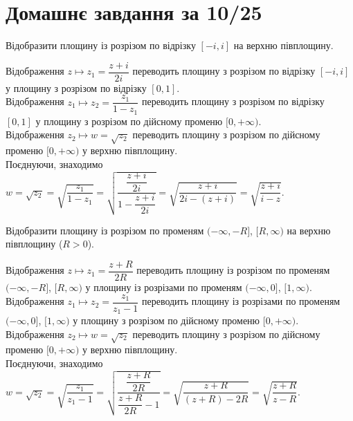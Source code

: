 \setcounter{section}{9}

\section{Домашнє завдання за 10/25}

\begin{problem}[Волковиський, 2.94]
    Відобразити площину із розрізом по відрізку $[-i, i]$ на верхню півплощину.
\end{problem}

\begin{solution}
    Відображення $z \mapsto z_1 = \dfrac{z + i}{2i}$ переводить площину з розрізом по відрізку $[-i, i]$ у площину з розрізом по відрізку $[0, 1]$. \\
    
    Відображення $z_1 \mapsto z_2 = \dfrac{z_1}{1 - z_1}$ переводить площину з розрізом по відрізку $[0, 1]$ у площину з розрізом по дійсному променю $[0, +\infty)$. \\
    
    Відображення $z_2 \mapsto w = \sqrt{z_2}$ переводить площину з розрізом по дійсному променю $[0,+\infty)$ у верхню півплощину. \\
    
    Поєднуючи, знаходимо $w = \sqrt{z_2} = \sqrt{\dfrac{z_1}{1 - z_1}} = \sqrt{\dfrac{\dfrac{z + i}{2i}}{1 - \dfrac{z + i}{2i}}} = \sqrt{\dfrac{z + i}{2i - (z + i)}} = \sqrt{\dfrac{z + i}{i - z}}.$
\end{solution}

\begin{problem}[Волковиський, 2.96]
    Відобразити площину із розрізом по променям $(-\infty, -R]$, $[R, \infty)$ на верхню півплощину ($R > 0$).
\end{problem}

\begin{solution}
    Відображення $z \mapsto z_1 = \dfrac{z + R}{2R}$ переводить площину із розрізом по променям $(-\infty, -R]$, $[R, \infty)$ у площину із розрізами по променям $(-\infty, 0]$, $[1, \infty)$. \\
    
    Відображення $z_1 \mapsto z_2 = \dfrac{z_1}{z_1 - 1}$ переводить площину із розрізами по променям $(-\infty, 0]$, $[1, \infty)$ у площину з розрізом по дійсному променю $[0, +\infty)$. \\
    
    Відображення $z_2 \mapsto w = \sqrt{z_2}$ переводить площину з розрізом по дійсному променю $[0,+\infty)$ у верхню півплощину. \\
    
    Поєднуючи, знаходимо $w = \sqrt{z_2} = \sqrt{\dfrac{z_1}{z_1 - 1}} = \sqrt{\dfrac{\dfrac{z + R}{2R}}{\dfrac{z + R}{2R} - 1}} = \sqrt{\dfrac{z + R}{(z + R) - 2R}} = \sqrt{\dfrac{z + R}{z - R}}$.
\end{solution}

